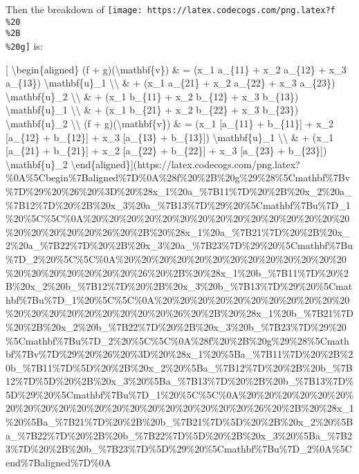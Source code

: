 \documentclass[]{article}
\begin{document}
Then the breakdown of
\texttt{[image: https://latex.codecogs.com/png.latex?f\\\%20\\\%2B\\\%20g]} is:

{[} \textbackslash{}begin\{aligned\} (f + g)(\textbackslash{}mathbf\{v\}) \& =
(x\_1 a\_\{11\} + x\_2 a\_\{12\} + x\_3 a\_\{13\})
\textbackslash{}mathbf\{u\}\_1 \textbackslash{}\textbackslash{} \& + (x\_1
a\_\{21\} + x\_2 a\_\{22\} + x\_3 a\_\{23\}) \textbackslash{}mathbf\{u\}\_2
\textbackslash{}\textbackslash{} \& + (x\_1 b\_\{11\} + x\_2 b\_\{12\} + x\_3
b\_\{13\}) \textbackslash{}mathbf\{u\}\_1 \textbackslash{}\textbackslash{} \& +
(x\_1 b\_\{21\} + x\_2 b\_\{22\} + x\_3 b\_\{23\})
\textbackslash{}mathbf\{u\}\_2 \textbackslash{}\textbackslash{} (f +
g)(\textbackslash{}mathbf\{v\}) \& = (x\_1 {[}a\_\{11\} + b\_\{11\}{]} + x\_2
{[}a\_\{12\} + b\_\{12\}{]} + x\_3 {[}a\_\{13\} + b\_\{13\}{]})
\textbackslash{}mathbf\{u\}\_1 \textbackslash{}\textbackslash{} \& + (x\_1
{[}a\_\{21\} + b\_\{21\}{]} + x\_2 {[}a\_\{22\} + b\_\{22\}{]} + x\_3
{[}a\_\{23\} + b\_\{23\}{]}) \textbackslash{}mathbf\{u\}\_2
\textbackslash{}end\{aligned\}{]}(https://latex.codecogs.com/png.latex?\%0A\%5Cbegin\%7Baligned\%7D\%0A\%28f\%20\%2B\%20g\%29\%28\%5Cmathbf\%7Bv\%7D\%29\%20\%26\%20\%3D\%20\%28x\_1\%20a\_\%7B11\%7D\%20\%2B\%20x\_2\%20a\_\%7B12\%7D\%20\%2B\%20x\_3\%20a\_\%7B13\%7D\%29\%20\%5Cmathbf\%7Bu\%7D\_1\%20\%5C\%5C\%0A\%20\%20\%20\%20\%20\%20\%20\%20\%20\%20\%20\%20\%20\%20\%20\%20\%20\%20\%20\%20\%26\%20\%2B\%20\%28x\_1\%20a\_\%7B21\%7D\%20\%2B\%20x\_2\%20a\_\%7B22\%7D\%20\%2B\%20x\_3\%20a\_\%7B23\%7D\%29\%20\%5Cmathbf\%7Bu\%7D\_2\%20\%5C\%5C\%0A\%20\%20\%20\%20\%20\%20\%20\%20\%20\%20\%20\%20\%20\%20\%20\%20\%20\%20\%20\%20\%26\%20\%2B\%20\%28x\_1\%20b\_\%7B11\%7D\%20\%2B\%20x\_2\%20b\_\%7B12\%7D\%20\%2B\%20x\_3\%20b\_\%7B13\%7D\%29\%20\%5Cmathbf\%7Bu\%7D\_1\%20\%5C\%5C\%0A\%20\%20\%20\%20\%20\%20\%20\%20\%20\%20\%20\%20\%20\%20\%20\%20\%20\%20\%20\%20\%26\%20\%2B\%20\%28x\_1\%20b\_\%7B21\%7D\%20\%2B\%20x\_2\%20b\_\%7B22\%7D\%20\%2B\%20x\_3\%20b\_\%7B23\%7D\%29\%20\%5Cmathbf\%7Bu\%7D\_2\%20\%5C\%5C\%0A\%28f\%20\%2B\%20g\%29\%28\%5Cmathbf\%7Bv\%7D\%29\%20\%26\%20\%3D\%20\%28x\_1\%20\%5Ba\_\%7B11\%7D\%20\%2B\%20b\_\%7B11\%7D\%5D\%20\%2B\%20x\_2\%20\%5Ba\_\%7B12\%7D\%20\%2B\%20b\_\%7B12\%7D\%5D\%20\%2B\%20x\_3\%20\%5Ba\_\%7B13\%7D\%20\%2B\%20b\_\%7B13\%7D\%5D\%29\%20\%5Cmathbf\%7Bu\%7D\_1\%20\%5C\%5C\%0A\%20\%20\%20\%20\%20\%20\%20\%20\%20\%20\%20\%20\%20\%20\%20\%20\%20\%20\%20\%20\%26\%20\%2B\%20\%28x\_1\%20\%5Ba\_\%7B21\%7D\%20\%2B\%20b\_\%7B21\%7D\%5D\%20\%2B\%20x\_2\%20\%5Ba\_\%7B22\%7D\%20\%2B\%20b\_\%7B22\%7D\%5D\%20\%2B\%20x\_3\%20\%5Ba\_\%7B23\%7D\%20\%2B\%20b\_\%7B23\%7D\%5D\%29\%20\%5Cmathbf\%7Bu\%7D\_2\%0A\%5Cend\%7Baligned\%7D\%0A
\end{document}
